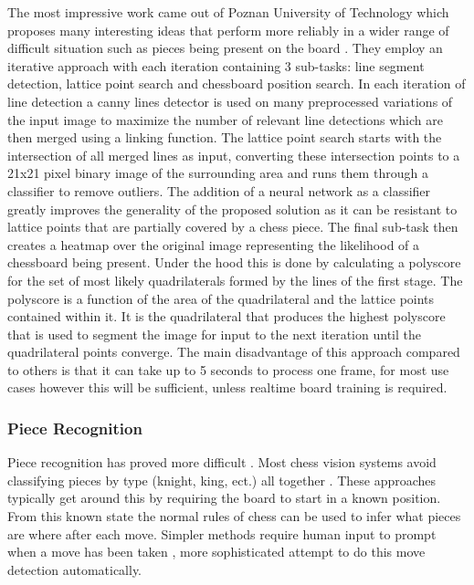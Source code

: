 The most impressive work came out of Poznan University of Technology which proposes many interesting ideas that perform more
reliably in a wider range of difficult situation such as pieces being present on the board \cite{}.  They employ an iterative
approach with each iteration containing 3 sub-tasks: line segment detection, lattice point search and chessboard position search.
In each iteration of line detection a canny lines detector \cite{} is used on many preprocessed variations of the input image
to maximize the number of relevant line detections which are then merged using a linking function. The lattice point search starts with
the intersection of all merged lines as input, converting these intersection points to a 21x21 pixel binary image of the surrounding area and
runs them through a classifier to remove outliers.  The addition of a neural network as a classifier greatly improves
the generality of the proposed solution as it can be resistant to lattice points that are partially covered by a chess piece.
The final sub-task then creates a heatmap over the original image representing the likelihood of a chessboard being present.
Under the hood this is done by calculating a polyscore for the set of most likely quadrilaterals formed by the lines of the first stage.
The polyscore is a function of the area of the quadrilateral and the lattice points contained within it.
It is the quadrilateral that produces the highest polyscore that is used to segment the image for input to the next iteration until the quadrilateral
points converge.  The main disadvantage of this approach compared to others is that it can take up to 5 seconds to process one frame,
for most use cases however this will be sufficient, unless realtime board training is required.

\subsubsection{Piece Recognition}

Piece recognition has proved more difficult \cite{}.  Most chess vision systems avoid classifying pieces by
type (knight, king, ect.) all together \cite{}.  These approaches typically get around this by requiring the board to start in a known position.
From this known state the normal rules of chess can be used to infer what pieces are where after each move.  Simpler methods
require human input to prompt when a move has been taken \cite{}, more sophisticated attempt to do this move detection automatically.


